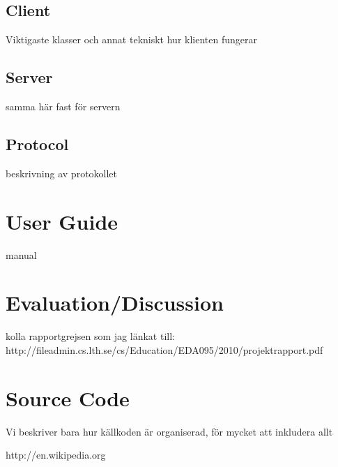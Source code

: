 \documentclass[a4paper]{article}
\begin{document}
\subsection{Client}
Viktigaste klasser och annat tekniskt hur klienten fungerar

\subsection{Server}
samma här fast för servern

\subsection{Protocol}
beskrivning av protokollet

\section{User Guide}
manual

\section{Evaluation/Discussion}
kolla rapportgrejsen som jag länkat till: http://fileadmin.cs.lth.se/cs/Education/EDA095/2010/projektrapport.pdf
\section{Source Code}
Vi beskriver bara hur källkoden är organiserad, för mycket att inkludera allt




\begin{thebibliography}{1}
http://en.wikipedia.org
\end{thebibliography}
\end{document}

